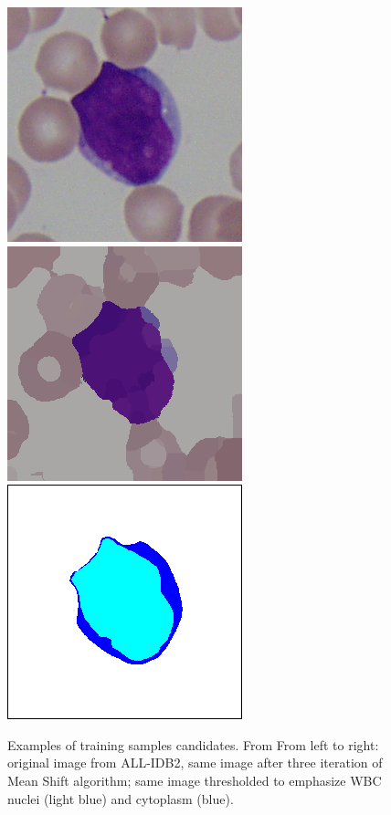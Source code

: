 {	\begin{figure}[!b]
		\centering
		\includegraphics[height=0.10\textheight]{images/2015_2_iciap/Im002_1}
		\includegraphics[height=0.10\textheight]{images/2015_2_iciap/Im002_1_MS}
		\includegraphics[height=0.10\textheight]{images/2015_2_iciap/Im002_1_T2}
		\caption[Training sample candidates.]{\label{fig:svm_candidates} Examples of training samples candidates. From From left to right: original image from ALL-IDB2, same image after three iteration of Mean Shift algorithm; same image thresholded to emphasize WBC nuclei (light blue) and cytoplasm (blue).}
	\end{figure}
	
}
